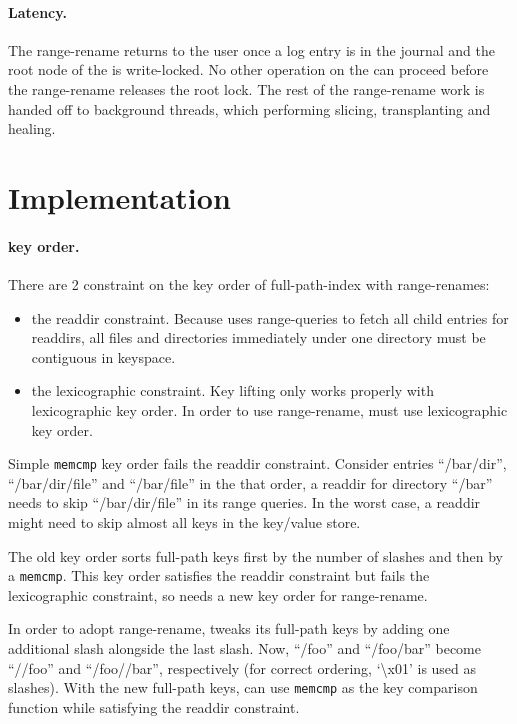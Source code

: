 \paragraph{Latency.}
The range-rename returns to the user once a log entry is in the journal and the
root node of the \bet is write-locked.
No other operation on the \bet can proceed before the range-rename releases the
root lock.
The rest of the range-rename work is handed off to background threads, which
performing slicing, transplanting and healing.

\section{Implementation}

\paragraph{\betrfs key order.}
There are 2 constraint on the key order of full-path-index \betrfs with
range-renames:

\begin{itemize}
\item the readdir constraint. Because \betrfs uses range-queries to fetch all
child entries for readdirs, all files and directories immediately under one
directory must be contiguous in keyspace.
\item the lexicographic constraint. Key lifting only works properly with
lexicographic key order. In order to use range-rename, \betrfs must use
lexicographic key order.
\end{itemize}

Simple \texttt{memcmp} key order fails the readdir constraint.
Consider entries ``/bar/dir'', ``/bar/dir/file'' and ``/bar/file'' in the that
order, a readdir for directory ``/bar'' needs to skip ``/bar/dir/file'' in
its range queries.
In the worst case, a readdir might need to skip almost all keys in the key/value
store.

The old \betrfs key order sorts full-path keys first by the number of slashes
and then by a \texttt{memcmp}.
This key order satisfies the readdir constraint but fails the lexicographic
constraint, so \betrfs needs a new key order for range-rename.

In order to adopt range-rename, \betrfs tweaks its full-path keys by adding one
additional slash alongside the last slash.
Now, ``/foo'' and ``/foo/bar'' become ``//foo'' and ``/foo//bar'', respectively
(for correct ordering, `\textbackslash x01' is used as slashes).
With the new full-path keys, \betrfs can use \texttt{memcmp} as the key
comparison function while satisfying the readdir constraint.

